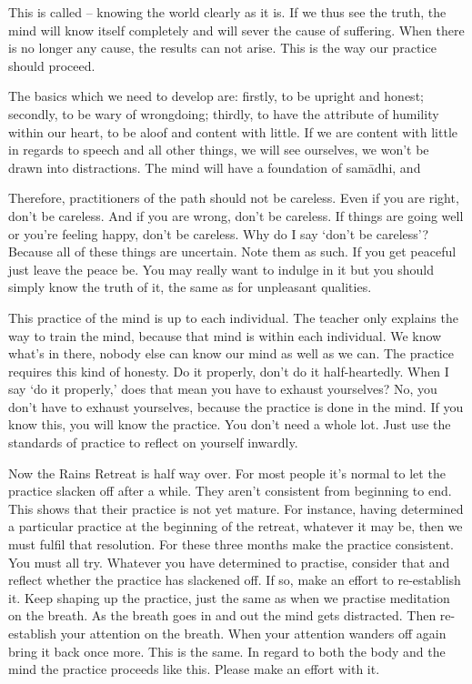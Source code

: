 This is called  -- knowing the world clearly as it is. If we thus see the truth, the mind will know itself completely and will sever the cause of suffering. When there is no longer any cause, the results can not arise. This is the way our practice should proceed. 

The basics which we need to develop are: firstly, to be upright and honest; secondly, to be wary of wrongdoing; thirdly, to have the attribute of humility within our heart, to be aloof and content with little. If we are content with little in regards to speech and all other things, we will see ourselves, we won't be drawn into distractions. The mind will have a foundation of  sam\=adhi, and 

Therefore, practitioners of the path should not be careless. Even if you are right, don't be careless. And if you are wrong, don't be careless. If things are going well or you're feeling happy, don't be careless. Why do I say `don't be careless'? Because all of these things are uncertain. Note them as such. If you get peaceful just leave the peace be. You may really want to indulge in it but you should simply know the truth of it, the same as for unpleasant qualities. 

This practice of the mind is up to each individual. The teacher only explains the way to train the mind, because that mind is within each individual. We know what's in there, nobody else can know our mind as well as we can. The practice requires this kind of honesty. Do it properly, don't do it half-heartedly. When I say `do it properly,' does that mean you have to exhaust yourselves? No, you don't have to exhaust yourselves, because the practice is done in the mind. If you know this, you will know the practice. You don't need a whole lot. Just use the standards of practice to reflect on yourself inwardly. 

Now the Rains Retreat is half way over. For most people it's normal to let the practice slacken off after a while. They aren't consistent from beginning to end. This shows that their practice is not yet mature. For instance, having determined a particular practice at the beginning of the retreat, whatever it may be, then we must fulfil that resolution. For these three months make the practice consistent. You must all try. Whatever you have determined to practise, consider that and reflect whether the practice has slackened off. If so, make an effort to re-establish it. Keep shaping up the practice, just the same as when we practise meditation on the breath. As the breath goes in and out the mind gets distracted. Then re-establish your attention on the breath. When your attention wanders off again bring it back once more. This is the same. In regard to both the body and the mind the practice proceeds like this. Please make an effort with it.

